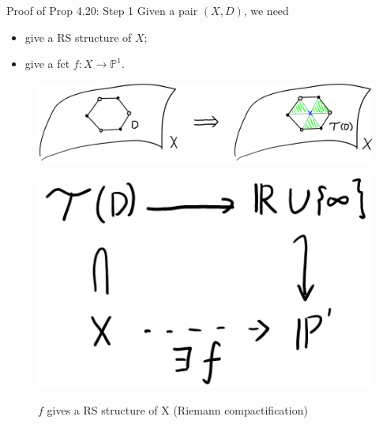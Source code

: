 \documentclass[pdf]{beamer}
\numberwithin{equation}{section}
\theoremstyle{plain}
\theoremstyle{plain}
\theoremstyle{remark}
\begin{document}
\begin{frame}{Proof of Prop 4.20: Step 1}
Given a pair $(X,D)$, we need
	\begin{itemize}
		\item give a RS structure of $X$;
		\item give a fct $f:X\longrightarrow \mathbb{P}^1$.
	\end{itemize}
\begin{figure}[th]
	\begin{minipage}[b]{\textwidth}
		\centering
		\includegraphics[width=.9\textwidth]{figures/refill.png}
	\end{minipage}
\end{figure}
\vspace{3mm}
\begin{figure}[th]
	\begin{minipage}[t]{.45\textwidth}
		\centering
		\vspace{-1cm}
		\includegraphics[width=.9\textwidth]{figures/refill2.png}
	\end{minipage}
\hfill
	\begin{minipage}[t]{.45\textwidth}
	$f$ gives a RS structure of X (Riemann compactification) 
\end{minipage}
\end{figure}
\end{frame}
\end{document}
